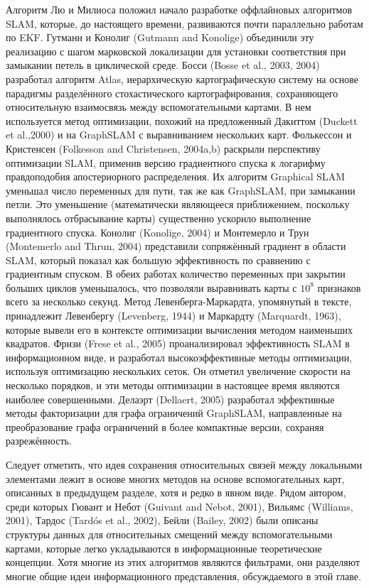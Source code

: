 \documentclass[10pt,a4paper]{article}
\begin{document}
Алгоритм Лю и Милиоса положил начало разработке оффлайновых алгоритмов SLAM, которые, до настоящего времени, развиваются почти параллельно работам по EKF. Гутманн и Конолиг (Gutmann and Konolige) объединили эту реализацию с шагом марковской локализации для установки соответствия при замыкании петель в циклической среде. Босси (Bosse et al., 2003, 2004) разработал алгоритм Atlas, иерархическую картографическую систему на основе парадигмы разделённого стохастического картографирования, сохраняющего относительную взаимосвязь между вспомогательными картами. В нем используется метод оптимизации, похожий на предложенный Дакиттом (Duckett et al.,2000) и на GraphSLAM с выравниванием нескольких карт.  Фолькессон и Кристенсен (Folkesson and Christensen, 2004a,b) раскрыли перспективу оптимизации SLAM, применив версию градиентного спуска к логарифму правдоподобия апостериорного распределения. Их алгоритм Graphical SLAM уменьшал число переменных для пути, так же как GraphSLAM, при замыкании петли. Это уменьшение (математически являющееся приближением, поскольку выполнялось отбрасывание карты) существенно ускорило выполнение градиентного спуска. Конолиг (Konolige, 2004) и Монтемерло и Трун  (Montemerlo and Thrun, 2004) представили сопряжённый градиент в области SLAM, который показал как большую эффективность по сравнению с градиентным спуском. В обеих работах  количество переменных при закрытии больших циклов уменьшалось, что позволяли выравнивать карты с $10^8$ признаков всего за несколько секунд. Метод Левенберга-Маркардта, упомянутый в тексте, принадлежит Левенбергу (Levenberg, 1944) и Маркардту (Marquardt, 1963), которые вывели его в контексте оптимизации вычисления методом наименьших квадратов. Фризи (Frese et al., 2005) проанализировал эффективность SLAM в информационном виде, и разработал высокоэффективные методы оптимизации, используя оптимизацию нескольких сеток. Он отметил увеличение скорости на несколько порядков, и эти методы оптимизации в настоящее время являются наиболее совершенными. Делаэрт (Dellaert, 2005) разработал эффективные методы факторизации для графа ограничений GraphSLAM, направленные на преобразование графа ограничений в более компактные версии, сохраняя разрежённость.

Следует отметить, что идея сохранения относительных связей между локальными элементами лежит в основе многих методов на основе вспомогательных карт, описанных в предыдущем разделе, хотя и редко в явном виде. Рядом автором, среди которых Гювант и Небот (Guivant and Nebot, 2001), Вильямс (Williams, 2001), Тардос (Tardós et al., 2002), Бейли (Bailey, 2002) были описаны структуры данных для относительных смещений между вспомогательными картами, которые легко укладываются в информационные теоретические концепции. Хотя многие из этих алгоритмов являются фильтрами, они разделяют многие общие идеи информационного представления, обсуждаемого в этой главе.
\end{document}
